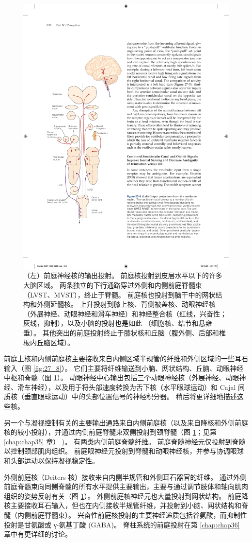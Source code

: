 \begin{figure}[htbp]
	\centering
	\includegraphics[width=0.4\linewidth]{chap27/fig_27_9}
	\caption{（左）前庭神经核的输出投射。 前庭核投射到皮层水平以下的许多大脑区域。 两条独立的下行通路穿过外侧和内侧前庭脊髓束（LVST、MVST），终止于脊髓。 前庭核也投射到脑干中的网状结构和外侧延髓核。 上升投射到膝上核、背侧被盖核、动眼神经核（外展神经、动眼神经和滑车神经）和神经整合核（红线，兴奋性；灰线，抑制），以及小脑的投射也是如此 （细胞核、结节和悬雍垂）。 其他突出的前庭投射终止于膝状核和丘脑（腹外侧、后部和椎板内丘脑区域）。}
	\label{fig:27_9}
\end{figure}


前庭上核和内侧前庭核主要接收来自内侧区域半规管的纤维和外侧区域的一些耳石输入（图 \ref{fig:27_8}）。
它们主要将纤维输送到小脑、网状结构、丘脑、动眼神经中枢和脊髓（图 \ref{fig:27_9}）。
动眼神经中心输出包括三个动眼神经核（外展神经、动眼神经、滑车神经），以及用于将头部速度转换为舌下核（水平眼球运动）和 Cajal 间质核（垂直眼球运动）中的头部位置信号的神经积分器。
稍后将更详细地描述这些核。


另一个与凝视控制有关的主要输出通路来自内侧前庭核（以及来自降核和外侧前庭核的较小投射），并通过内侧前庭脊髓束双侧投射到颈脊髓（图 \ref{fig:27_9}；见第 \ref{chap:chap35} 章） )。
有两类内侧前庭脊髓纤维。
前庭脊髓神经元仅投射到脊髓以控制颈部肌肉组织。
前庭眼神经元投射到脊髓和动眼神经核，并参与协调眼球和头部运动以保持凝视稳定性。


外侧前庭核（Deiters 核）接收来自内侧半规管和外侧耳石器官的纤维。
通过外侧前庭脊髓束向同侧脊髓的所有水平提供主要输出，主要与通过调节肢体和轴向肌肉组织的姿势反射有关（图 \ref{fig:27_9}）。
外侧前庭核神经元也大量投射到网状结构。
前庭降核主要接收耳石输入，但也在内侧接收半规管纤维，并投射到小脑、网状结构和脊髓（内侧前庭脊髓束）。
兴奋性前庭核投射的主要神经递质包括谷氨酸，而抑制性投射是甘氨酸或 γ-氨基丁酸 (GABA)。
脊柱系统的前庭投射在第 \ref{chap:chap36} 章中有更详细的讨论。


